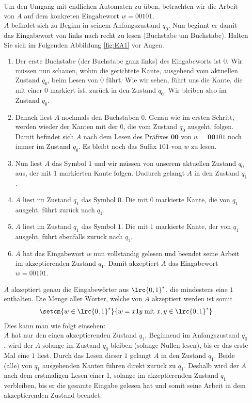 Um den Umgang mit endlichen Automaten zu üben, betrachten wir die Arbeit von $A$ auf dem konkreten Eingabewort $w = 00101$.\\
$A$ befindet sich zu Beginn in seinem Anfangszustand $q_0$. Nun beginnt er damit das Eingabewort von links nach recht zu lesen (Buchstabe um Buchstabe). Halten Sie sich im Folgenden Abbildung \cref{fig:EA1} vor Augen.
\begin{enumerate}
	\item Der erste Buchstabe (der Buchstabe ganz links) des Eingabeworts ist $0$. Wir müssen nun schauen, wohin die gerichtete Kante, ausgehend vom aktuellen Zustand $q_0$, beim Lesen von $0$ führt. Wie wir sehen, führt uns die Kante, die mit einer $0$ markiert ist, zurück in den Zustand $q_0$. Wir bleiben also im Zustand $q_0$.
	\item Danach liest $A$ nochmals den Buchstaben $0$. Genau wie im ersten Schritt, werden wieder der Kanten mit der $0$, die vom Zustand $q_0$ ausgeht, folgen. Damit befindet sich $A$ nach dem Lesen des Präfixes $\mathbf{00}$ von $w = \mathbf{00}101$ noch immer im Zustand $q_0$. Es bleibt noch das Suffix $101$ von $w$ zu lesen.
	\item Nun liest $A$ das Symbol $1$ und wir müssen von unserem aktuellen Zustand $q_0$ aus, der mit $1$ markierten Kante folgen. Dadurch gelangt $A$ in den Zustand $q_1$.
	\item $A$ liest im Zustand $q_1$ das Symbol $0$. Die mit $0$ markierte Kante, die von $q_1$ ausgeht, führt zurück nach $q_1$.
	\item $A$ liest im Zustand $q_1$ das Symbol $1$. Die mit $1$ markierte Kante, der von $q_1$ ausgeht, führt ebenfalls zurück nach $q_1$.
	\item $A$ hat das Eingabewort $w$ nun vollständig gelesen und beendet seine Arbeit im akzeptierenden Zustand $q_1$. Damit akzeptiert $A$ das Eingabewort $w = 00101$.
\end{enumerate}
$A$ akzeptiert genau die Eingabewörter aus $\lrc{0,1}^*$, die mindestens eine $1$ enthalten. Die Menge aller Wörter, welche von $A$ akzeptiert werden ist somit
\begin{align}\label{eq:akezeptierte_sprache1}
	\setcm{w\in\lrc{0,1}^*}{w = x1y\;\text{mit}\;x,y\in\lrc{0,1}^*}
\end{align}
\noindent
Dies kann man wie folgt einsehen:\\
$A$ hat nur den einen akzeptierenden Zustand $q_1$. Beginnend im Anfangszustand $q_0$, wird der $A$ solange im Zustand $q_0$ bleiben (solange Nullen lesen), bis er das erste Mal eine $1$ liest. Durch das Lesen dieser $1$ gelangt $A$ in den Zustand $q_1$. Beide (alle) von $q_1$ ausgehenden Kanten führen direkt zurück zu $q_1$. Deshalb wird der $A$ nach dem erstmaligen Lesen einer $1$, solange im akzeptierenden Zustand $q_1$ verbleiben, bis er die gesamte Eingabe gelesen hat und somit seine Arbeit in dem akzeptierenden Zustand beendet.\\

